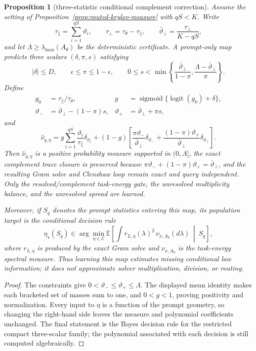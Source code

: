 \documentclass[11pt]{article}
\newtheorem{proposition}{Proposition}
\begin{document}
\begin{proposition}[three-statistic conditional complement correction]
\label{prop:conditional-complement-correction}
Assume the setting of Proposition~\ref{prop:routed-krylov-measure} with
$qS<K$.  Write
\[
 \tau_\parallel=\sum_{i=1}^{qS}\vartheta_i,
 \qquad \tau_\perp=\tau_\theta-\tau_\parallel,
 \qquad \bar\vartheta_\perp=\frac{\tau_\perp}{K-qS},
\]
and let $\Lambda\geq\lambda_{\max}(A_\theta)$ be the deterministic
certificate.  A prompt-only map predicts three scalars
$(\delta,\pi,s)$ satisfying
\[
 |\delta|\leq D,\qquad \epsilon\leq\pi\leq1-\epsilon,
 \qquad
 0\leq s<\min\left\{
 \frac{\bar\vartheta_\perp}{1-\pi},
 \frac{\Lambda-\bar\vartheta_\perp}{\pi}
 \right\}.
\]
Define
\begin{align*}
 g_0&=\tau_\parallel/\tau_\theta,
 &g&=\operatorname{sigmoid}\{\operatorname{logit}(g_0)+\delta\},\\
 \vartheta_-&=\bar\vartheta_\perp-(1-\pi)s,
 &\vartheta_+&=\bar\vartheta_\perp+\pi s,
\end{align*}
and
\[
 \widehat\nu_{q,\eta}
 =g\sum_{i=1}^{qS}\frac{\vartheta_i}{\tau_\parallel}
      \delta_{\vartheta_i}
 +(1-g)\left[
   \frac{\pi\vartheta_-}{\bar\vartheta_\perp}\delta_{\vartheta_-}
  +\frac{(1-\pi)\vartheta_+}{\bar\vartheta_\perp}
      \delta_{\vartheta_+}\right].
\]
Then $\widehat\nu_{q,\eta}$ is a positive probability measure supported in
$(0,\Lambda]$, the exact complement trace closure is preserved because
$\pi\vartheta_-+(1-\pi)\vartheta_+=\bar\vartheta_\perp$, and the resulting
Gram solve and Clenshaw loop remain exact and query independent.  Only the
resolved/complement task-energy gate, the unresolved multiplicity balance,
and the unresolved spread are learned.

Moreover, if $S_q$ denotes the prompt statistics entering this map, its
population target is the conditional decision rule
\[
 \eta_\star(S_q)\in\arg\min_{\eta\in\mathcal E}
 \mathbb E\!\left[
   \int r_{L,\eta}(\lambda)^2\,\nu_{x,A_\theta}(d\lambda)
   \ \middle|\ S_q
 \right],
\]
where $r_{L,\eta}$ is produced by the exact Gram solve and
$\nu_{x,A_\theta}$ is the task-energy spectral measure.  Thus learning this
map estimates missing conditional law information; it does not approximate
solver multiplication, division, or routing.
\end{proposition}
\begin{proof}
The constraints give $0<\vartheta_-\leq\vartheta_+\leq\Lambda$.
The displayed mean identity makes each bracketed set of masses sum to one,
and $0<g<1$, proving positivity and normalization.  Every input to $\eta$ is
a function of the prompt geometry, so changing the right-hand side leaves
the measure and polynomial coefficients unchanged.  The final statement is
the Bayes decision rule for the restricted compact three-scalar family; the
polynomial associated with each decision is still computed algebraically.
\end{proof}
\end{document}
